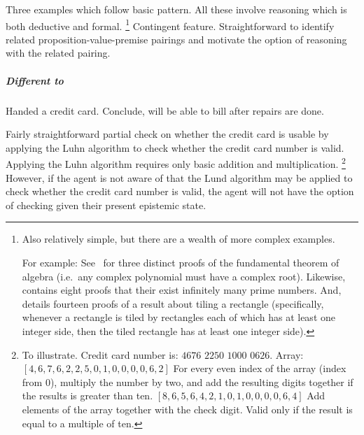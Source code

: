 \begin{note}
  Three examples which follow basic pattern.
  All these involve reasoning which is both deductive and formal.%
  \footnote{
    Also relatively simple, but there are a wealth of more complex examples.

    For example:
    See~\textcite{Fine:1997vc} for three distinct proofs of the fundamental theorem of algebra (i.e.\ any complex polynomial must have a complex root).
    Likewise, \textcite{Ribenboim:2012ts} contains eight proofs that their exist infinitely many prime numbers.
    And, \textcite{Wagon:1987vm} details fourteen proofs of a result about tiling a rectangle (specifically, whenever a rectangle is tiled by rectangles each of which has at least one integer side, then the tiled rectangle has at least one integer side).
  }
  Contingent feature.
  Straightforward to identify related proposition-value-premise pairings and motivate the option of reasoning with the related pairing.


\end{note}

\subparagraph{Different to}

\begin{note}
  \begin{illustration}
    \label{illu:number-check}
    Handed a credit card.
    Conclude, will be able to bill after repairs are done.
  \end{illustration}

  Fairly straightforward partial check on whether the credit card is usable by applying the Luhn algorithm to check whether the credit card number is valid.
  Applying the Luhn algorithm requires only basic addition and multiplication.%
  \footnote{
    To illustrate.
    Credit card number is:
    \(4676\) \(2250\) \(1000\) \(0626\).
    Array:
    \([4,6,7,6,2,2,5,0,1,0,0,0,0,6,2]\)
    For every even index of the array (index from \(0\)), multiply the number by two, and add the resulting digits together if the results is greater than ten.
    \([8,6,5,6,4,2,1,0,1,0,0,0,0,6,4]\)
    Add elements of the array together with the check digit.
    Valid only if the result is equal to a multiple of ten.
  }
  However, if the agent is not aware of that the Lund algorithm may be applied to check whether the credit card number is valid, the agent will not have the option of checking given their present epistemic state.
\end{note}

